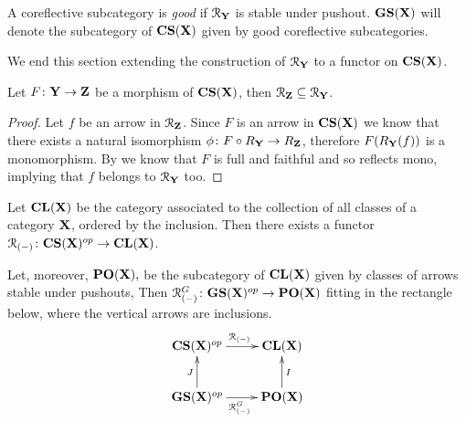 \documentclass[a4paper,UKenglish,cleveref,pdftex,thm-restate,numberwithinsect]{lipics-v2021}
\newcommand{\cori}{\mathbf{CS}}
\newcommand{\cla}{\mathbf{CL}}
\newcommand{\pos}{\mathbf{PO}}
\newcommand{\gori}{\mathbf{GS}}
\def\X{\textbf {\textup{X}}}
\def\Y{\textbf {\textup{Y}}}
\def\Z{\textbf {\textup{Z}}}
\begin{document}
\begin{definition}
	A coreflective subcategory is \emph{good} if  $\mathcal{R}_\Y$ is stable under pushout. $\gori(\X)$ will denote the subcategory of $\cori(\X)$ given by good coreflective subcategories. 
\end{definition}

\iffalse 
\begin{remark}\label{rem:good}
	Let $\Y$ be a full subcategory of $\X$ with coreflector $R_\Y$.  Let also $f\colon X\to Y$ be in $\mathcal{R}_\Y$ and consider the following two diagrams, where the left one is a pushout. Then $\Y$ is a good subcategory if and only if $R_{\Y}()$
\end{remark}
\fi 

We end this section extending the construction of $\mathcal{R}_\Y$ to a functor on $\cori(\X)$.

\begin{proposition}\label{prop:funct}
	Let $F\colon \Y \to \Z$ be a morphism of $\cori(\X)$, then $\mathcal{R}_\Z \subseteq \mathcal{R}_{\Y}$.
\end{proposition}
\begin{proof}
	Let $f$ be an arrow in $\mathcal{R}_\Z$. Since $F$ is an arrow in $\cori(\X)$ we know that there exists a natural isomorphism $\phi\colon F\circ R_\Y\to R_\Z$, therefore $F(R_\Y(f))$ is a monomorphism. By  we know that $F$ is full and faithful and so reflects mono, implying that $f$ belongs to $\mathcal{R}_\Y$ too.
\end{proof}

\begin{corollary}\label{cor:funct}
	Let $\cla(\X)$ be the category associated to the collection of all classes of a category $\X$, ordered by the inclusion. Then there exists a functor $\mathcal{R}_{(-)}\colon \cori(\X)^{op}\to \cla(\X) $.
	
	Let, moreover, $\pos(\X),$ be the subcategory of $\cla(\X)$  given by classes of arrows stable under pushouts, Then  $\mathcal{R}^G_{(-)}\colon \gori(\X)^{op}\to \pos(\X) $ fitting in the rectangle below, where the vertical arrows are inclusions.
	\[\xymatrix{\cori(\X)^{op} \ar[r]^{\mathcal{R}_{(-)}}& \cla(\X)\\ \gori(\X)^{op} \ar[u]^{J} \ar[r]_{\mathcal{R}^{G}_{(-)}}& \pos(\X) \ar[u]_{I}}\]
\end{corollary}
\end{document}
